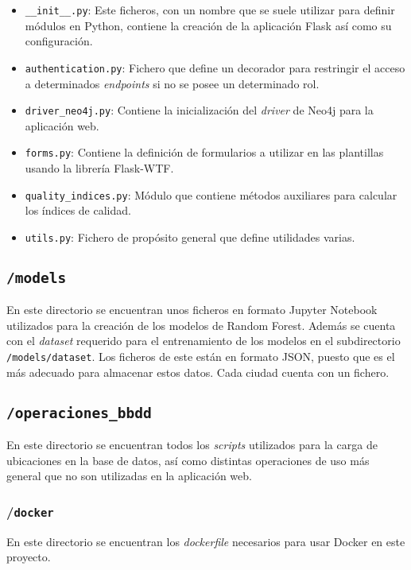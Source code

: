 \begin{itemize}
	\item \texttt{\_\_init\_\_.py}: Este ficheros, con un nombre que se suele utilizar para definir módulos en Python, contiene la creación de la aplicación Flask así como su configuración.
	\item \texttt{authentication.py}: Fichero que define un decorador para restringir el acceso a determinados \textit{endpoints} si no se posee un determinado rol.
	\item \texttt{driver\_neo4j.py}: Contiene la inicialización del \textit{driver} de Neo4j para la aplicación web.
	\item \texttt{forms.py}: Contiene la definición de formularios a utilizar en las plantillas usando la librería Flask-WTF.
	\item \texttt{quality\_indices.py}: Módulo que contiene métodos auxiliares para calcular los índices de calidad.
	\item \texttt{utils.py}: Fichero de propósito general que define utilidades varias.
\end{itemize}


\subsection{\texttt{/models}}
En este directorio se encuentran unos ficheros en formato Jupyter Notebook utilizados para la creación de los modelos de Random Forest. Además se cuenta con el \textit{dataset} requerido para el entrenamiento de los modelos en el subdirectorio \texttt{/models/dataset}. Los ficheros de este están en formato JSON, puesto que es el más adecuado para almacenar estos datos. Cada ciudad cuenta con un fichero.

\subsection{\texttt{/operaciones\_bbdd}}
En este directorio se encuentran todos los \textit{scripts} utilizados para la carga de ubicaciones en la base de datos, así como distintas operaciones de uso más general que no son utilizadas en la aplicación web.

\subsubsection{/\texttt{docker}}
En este directorio se encuentran los \textit{dockerfile} necesarios para usar Docker en este proyecto.

